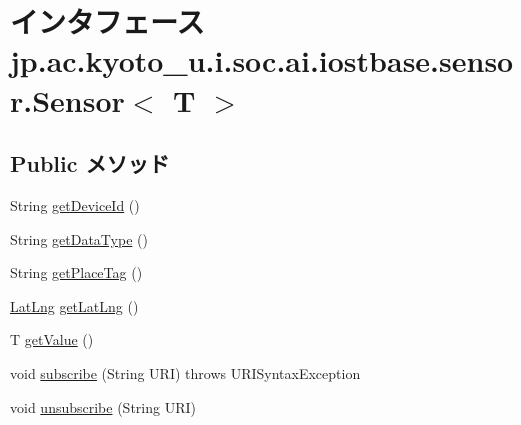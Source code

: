 \hypertarget{interfacejp_1_1ac_1_1kyoto__u_1_1i_1_1soc_1_1ai_1_1iostbase_1_1sensor_1_1_sensor_3_01_t_01_4}{\section{インタフェース jp.\-ac.\-kyoto\-\_\-u.\-i.\-soc.\-ai.\-iostbase.\-sensor.\-Sensor$<$ T $>$}
\label{interfacejp_1_1ac_1_1kyoto__u_1_1i_1_1soc_1_1ai_1_1iostbase_1_1sensor_1_1_sensor_3_01_t_01_4}
}
\subsection*{Public メソッド}
\begin{DoxyCompactItemize}
\item 
String \hyperlink{interfacejp_1_1ac_1_1kyoto__u_1_1i_1_1soc_1_1ai_1_1iostbase_1_1sensor_1_1_sensor_3_01_t_01_4_aff2503fceb8092b01e001fc04f83ea31}{get\-Device\-Id} ()
\item 
String \hyperlink{interfacejp_1_1ac_1_1kyoto__u_1_1i_1_1soc_1_1ai_1_1iostbase_1_1sensor_1_1_sensor_3_01_t_01_4_a9c73f7d2ed9cc8a26f89f22cf97be53e}{get\-Data\-Type} ()
\item 
String \hyperlink{interfacejp_1_1ac_1_1kyoto__u_1_1i_1_1soc_1_1ai_1_1iostbase_1_1sensor_1_1_sensor_3_01_t_01_4_af748444ed8f30b8cbd4dc8aa0312fcb3}{get\-Place\-Tag} ()
\item 
\hyperlink{classjp_1_1ac_1_1kyoto__u_1_1i_1_1soc_1_1ai_1_1iostbase_1_1service_1_1intf_1_1_lat_lng}{Lat\-Lng} \hyperlink{interfacejp_1_1ac_1_1kyoto__u_1_1i_1_1soc_1_1ai_1_1iostbase_1_1sensor_1_1_sensor_3_01_t_01_4_a3182b07706c11191edef1e94bee9b22f}{get\-Lat\-Lng} ()
\item 
T \hyperlink{interfacejp_1_1ac_1_1kyoto__u_1_1i_1_1soc_1_1ai_1_1iostbase_1_1sensor_1_1_sensor_3_01_t_01_4_a82f9001f582da9eb2d95e0a0e950663a}{get\-Value} ()
\item 
void \hyperlink{interfacejp_1_1ac_1_1kyoto__u_1_1i_1_1soc_1_1ai_1_1iostbase_1_1sensor_1_1_sensor_3_01_t_01_4_a2c7b6a2db8b8568bbdd4fa80b467e289}{subscribe} (String U\-R\-I)  throws U\-R\-I\-Syntax\-Exception
\item 
void \hyperlink{interfacejp_1_1ac_1_1kyoto__u_1_1i_1_1soc_1_1ai_1_1iostbase_1_1sensor_1_1_sensor_3_01_t_01_4_a424987bb959cfb66594f9a01e4888cb5}{unsubscribe} (String U\-R\-I)
\end{DoxyCompactItemize}


